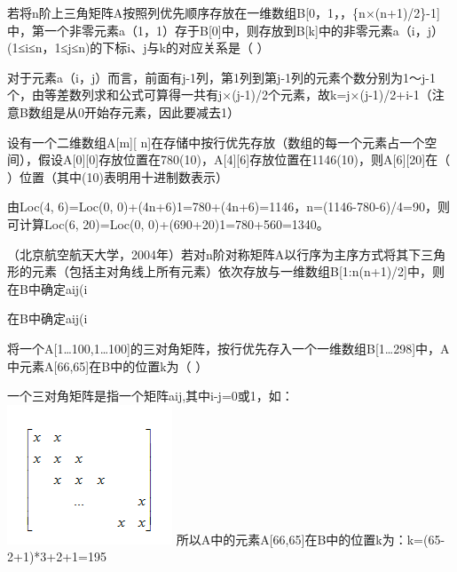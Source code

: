 \question 若将n阶上三角矩阵A按照列优先顺序存放在一维数组B{[}0，1，，\{n×(n+1)/2\}-1{]}中，第一个非零元素a（1，1）存于B{[}0{]}中，则存放到B{[}k{]}中的非零元素a（i，j）(1≤i≤n，1≤j≤n)的下标i、j与k的对应关系是（
）
\par{}
\begin{solution}对于元素a（i，j）而言，前面有j-1列，第1列到第j-1列的元素个数分别为1～j-1个，由等差数列求和公式可算得一共有j×(j-1)/2个元素，故k=j×(j-1)/2+i-1（注意B数组是从0开始存元素，因此要减去1）
\end{solution}
\question 设有一个二维数组A{[}m{]}{[}
n{]}在存储中按行优先存放（数组的每一个元素占一个空间），假设A{[}0{]}{[}0{]}存放位置在780(10)，A{[}4{]}{[}6{]}存放位置在1146(10)，则A{[}6{]}{[}20{]}在（
）位置（其中(10)表明用十进制数表示）
\par{}
\begin{solution}由Loc(4, 6)=Loc(0,
0)+(4n+6)1=780+(4n+6)=1146，n=(1146-780-6)/4=90，则可计算Loc(6,
20)=Loc(0, 0)+(690+20)1=780+560=1340。
\end{solution}
\question （北京航空航天大学，2004年）若对n阶对称矩阵A以行序为主序方式将其下三角形的元素（包括主对角线上所有元素）依次存放与一维数组B{[}1:n(n+1)/2{]}中，则在B中确定aij(i
\par{}
\begin{solution}在B中确定aij(i
\end{solution}
\question 将一个A{[}1\ldots{}100,1\ldots{}100{]}的三对角矩阵，按行优先存入一个一维数组B{[}1\ldots{}298{]}中，A中元素A{[}66,65{]}在B中的位置k为（
）
\par{}
\begin{solution}一个三对角矩阵是指一个矩阵aij,其中\textbar{}i-j\textbar{}=0或1，如：\includegraphics[width=1.93750in,height=1.63542in]{computerassets/2ae8b9b63314226ae69aac4bbb2f4656.png}
所以A中的元素A{[}66,65{]}在B中的位置k为：k=(65-2+1)*3+2+1=195
\end{solution}
